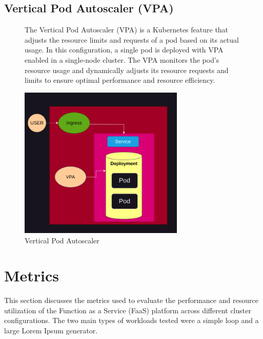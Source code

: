 \documentclass{article}
\begin{document}
\subsection{Vertical Pod Autoscaler (VPA)}
\nobreak
\vspace{-30px}
\begin{figure}[h]
    \begin{minipage}[t]{0.6\textwidth}
        \vspace{-120px}
        The Vertical Pod Autoscaler (VPA) is a Kubernetes feature that adjusts the
        resource limits and requests of a pod based on its actual usage. In this
        configuration, a single pod is deployed with VPA enabled in a single-node
        cluster. The VPA monitors the pod's resource usage and dynamically adjusts its
        resource requests and limits to ensure optimal performance and resource
        efficiency.
    \end{minipage}%
    \hfill
    \begin{minipage}[b]{0.4\textwidth}
        \centering
        \includegraphics[width=0.7\textwidth]{../images/vpa.png}
        \caption{Vertical Pod Autoscaler}
        \label{fig:vpa}
    \end{minipage}
\end{figure}

\section{Metrics}
This section discusses the metrics used to evaluate the performance and resource utilization of the Function as a Service (FaaS) platform across different cluster configurations. The two main types of workloads tested were a simple loop and a large Lorem Ipsum generator.
\end{document}
